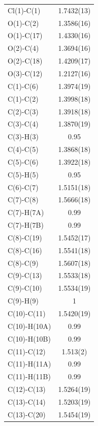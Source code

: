 \begin{center}
\tablefirsthead{%
\toprule}
\tablelasttail{\bottomrule}
{\footnotesize \singlespacing
\begin{supertabular}{p{1.5in}c}
Cl(1)-C(1) &1.7432(13)\\
O(1)-C(2) &1.3586(16)\\
O(1)-C(17) &1.4330(16)\\
O(2)-C(4) &1.3694(16)\\
O(2)-C(18) &1.4209(17)\\
O(3)-C(12) &1.2127(16)\\
C(1)-C(6) &1.3974(19)\\
C(1)-C(2) &1.3998(18)\\
C(2)-C(3) &1.3918(18)\\
C(3)-C(4) &1.3870(19)\\
C(3)-H(3) &0.95\\
C(4)-C(5) &1.3868(18)\\
C(5)-C(6) &1.3922(18)\\
C(5)-H(5) &0.95\\
C(6)-C(7) &1.5151(18)\\
C(7)-C(8) &1.5666(18)\\
C(7)-H(7A) &0.99\\
C(7)-H(7B) &0.99\\
C(8)-C(19) &1.5452(17)\\
C(8)-C(16) &1.5541(18)\\
C(8)-C(9) &1.5607(18)\\
C(9)-C(13) &1.5533(18)\\
C(9)-C(10) &1.5534(19)\\
C(9)-H(9) &1\\
C(10)-C(11) &1.5420(19)\\
C(10)-H(10A) &0.99\\
C(10)-H(10B) &0.99\\
C(11)-C(12) &1.513(2)\\
C(11)-H(11A) &0.99\\
C(11)-H(11B) &0.99\\
C(12)-C(13) &1.5264(19)\\
C(13)-C(14) &1.5203(19)\\
C(13)-C(20) &1.5454(19)\\

\end{supertabular}}
\end{center}
